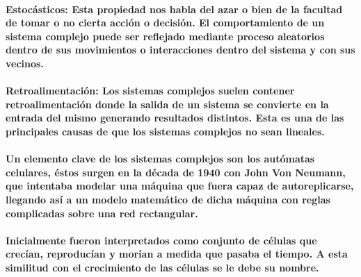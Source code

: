       \paragraph{\textbf{Estocásticos}: Esta propiedad nos habla del azar o bien de la facultad de tomar o no cierta acción o decisión. El comportamiento de un sistema complejo puede ser reflejado mediante proceso aleatorios dentro de sus movimientos o interacciones dentro del sistema y con sus vecinos.}
      \paragraph{\textbf{Retroalimentación}: Los sistemas complejos suelen contener retroalimentación donde la salida de un sistema se convierte en la entrada del mismo generando resultados distintos. Esta es una de las principales causas de que los sistemas complejos no sean lineales.\cite{3} \cite{5}}
      \paragraph{Un elemento clave de los sistemas complejos son los autómatas celulares, éstos surgen en la década de 1940 con John Von Neumann, que intentaba modelar una máquina que fuera capaz de autoreplicarse, llegando así a un modelo matemático de dicha máquina con reglas complicadas sobre una red rectangular.}
      \paragraph{Inicialmente fueron interpretados como conjunto de células que crecían, reproducían y morían a medida que pasaba el tiempo. A esta similitud con el crecimiento de las células se le debe su nombre.}
